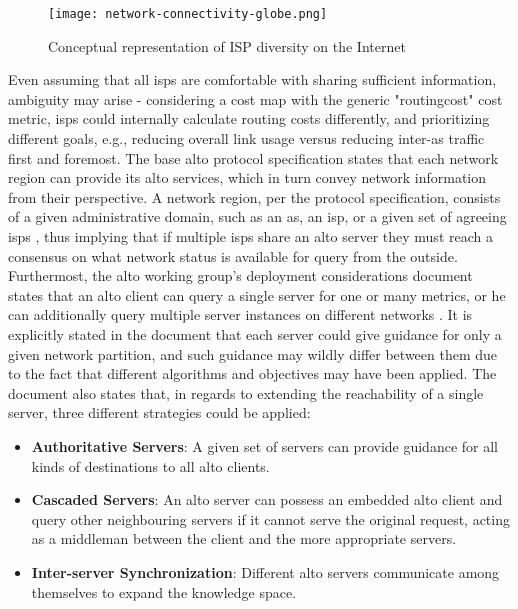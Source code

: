     \begin{figure}[H]
    \centering
    \texttt{[image: network-connectivity-globe.png]}
    \caption{Conceptual representation of ISP diversity on the Internet}
    \label{fig:network-connectivity-globe}
    \end{figure}

    Even assuming that all \glspl{isp} are comfortable with sharing sufficient information, ambiguity may arise - considering a cost map with the generic "routingcost" cost metric, \glspl{isp} could internally calculate routing costs differently, and prioritizing different goals, e.g., reducing overall link usage versus reducing inter-\gls{as} traffic first and foremost.
    The base \gls{alto} protocol specification states that each network region can provide its \gls{alto} services, which in turn convey network information from their perspective.
    A network region, per the protocol specification, consists of a given administrative domain, such as an \gls{as}, an \gls{isp}, or a given set of agreeing \glspl{isp} \cite{alto-protocol}, thus implying that if multiple \glspl{isp} share an \gls{alto} server they must reach a consensus on what network status is available for query from the outside.
    Furthermost, the \gls{alto} working group's deployment considerations \cite{alto-deployment-considerations} document states that an \gls{alto} client can query a single server for one or many metrics, or he can additionally query multiple server instances on different networks \cite{alto-deployment-considerations}.
    It is explicitly stated in the document that each server could give guidance for only a given network partition, and such guidance may wildly differ between them due to the fact that different algorithms and objectives may have been applied.
    The document also states that, in regards to extending the reachability of a single server, three different strategies could be applied:

\begin{itemize}
    \item \textbf{Authoritative Servers}: A given set of servers can provide guidance for all kinds of destinations to all \gls{alto} clients.
    \item \textbf{Cascaded Servers}: An \gls{alto} server can possess an embedded \gls{alto} client and query other neighbouring servers if it cannot serve the original request, acting as a middleman between the client and the more appropriate servers.
    \item \textbf{Inter-server Synchronization}: Different \gls{alto} servers communicate among themselves to expand the knowledge space.
\end{itemize}

